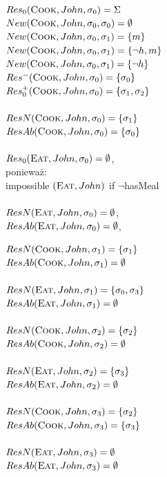 \documentclass{article}
\begin{document}
\begin{minipage}[t]{0.5\textwidth}
$Res_{0}(\textsc{Cook},John,\sigma_{0})=\Sigma$\\
$New(\textsc{Cook},John,\sigma_{0},\sigma_{0})=\emptyset$\\
$New(\textsc{Cook},John,\sigma_{0},\sigma_{1})=\{m\}$\\
$New(\textsc{Cook},John,\sigma_{0},\sigma_{1})=\{\neg h,m\}$\\
$New(\textsc{Cook},John,\sigma_{0},\sigma_{1})=\{\neg h\}$\\
$Res^{-}(\textsc{Cook},John,\sigma_{0})=\{\sigma_{0}\}$\\
$Res_{0}^{+}(\textsc{Cook},John,\sigma_{0})=\{\sigma_{1},\sigma_{2}\}$\\\\
$ResN(\textsc{Cook},John,\sigma_{0})=\{\sigma_{1}\}$\\
$ResAb(\textsc{Cook},John,\sigma_{0})=\{\sigma_{0}\}$\\\\
$Res_{0}(\textsc{Eat},John,\sigma_{0})=\emptyset$,\\ 
ponieważ: \\impossible $(\textsc{Eat},John)$ if $\neg$hasMeal\\\\
$ResN(\textsc{Eat},John,\sigma_{0})=\emptyset$,\\ 
$ResAb(\textsc{Eat},John,\sigma_{0})=\emptyset$,\\ 

\end{minipage}
\begin{minipage}[t]{0.5\textwidth}
$ResN(\textsc{Cook},John,\sigma_{1})=\{\sigma_{1}\}$\\
$ResAb(\textsc{Cook},John,\sigma_{1})=\emptyset$\\\\
$ResN(\textsc{Eat},John,\sigma_{1})=\{\sigma_{0},\sigma_{3}\}$\\ 
$ResAb(\textsc{Eat},John,\sigma_{1})=\emptyset$\\\\
$ResN(\textsc{Cook},John,\sigma_{2})=\{\sigma_{2}\}$\\
$ResAb(\textsc{Cook},John,\sigma_{2})=\emptyset$\\\\
$ResN(\textsc{Eat},John,\sigma_{2})=\{\sigma_{3}\}$\\ 
$ResAb(\textsc{Eat},John,\sigma_{2})=\emptyset$\\\\
$ResN(\textsc{Cook},John,\sigma_{3})=\{\sigma_{2}\}$\\
$ResAb(\textsc{Cook},John,\sigma_{3})=\{\sigma_{3}\}$\\\\
$ResN(\textsc{Eat},John,\sigma_{3})=\emptyset$\\ 
$ResAb(\textsc{Eat},John,\sigma_{3})=\emptyset$\\\\
\end{minipage}
\end{document}

